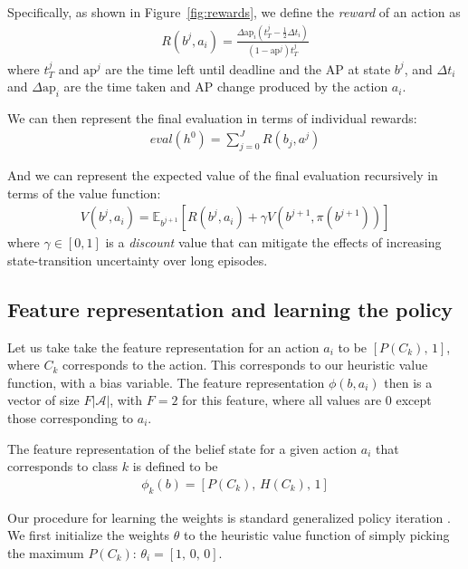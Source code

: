 Specifically, as shown in Figure~\ref{fig:rewards}, we define the \emph{reward} of an action as
\begin{align}\label{eq:advanced}
R(b^j,a_i) = \frac{\Delta \text{ap}_i (t_T^j-\frac{1}{2}\Delta t_i)}{(1-\text{ap}^j)t_T^j}
\end{align}
where $t_T^j$ and $\text{ap}^j$ are the time left until deadline and the AP at state $b^j$, and $\Delta t_i$ and $\Delta \text{ap}_i$ are the time taken and AP change produced by the action $a_i$.


We can then represent the final evaluation in terms of individual rewards:
\begin{align}
eval(h^0) = \sum_{j=0}^J R(b_j,a^{j})
\end{align}

And we can represent the expected value of the final evaluation recursively in terms of the value function:
\begin{align} \label{eq:recursive_value}
V(b^j,a_i) = \mathbb{E}_{b^{j+1}} [R(b^j,a_i) + \gamma V(b^{j+1},\pi(b^{j+1}))]
\end{align}
where $\gamma \in [0,1]$ is a \emph{discount} value that can mitigate the effects of increasing state-transition uncertainty over long episodes.

\subsection{Feature representation and learning the policy}

Let us take take the feature representation for an action $a_i$ to be $[P(C_k), \, 1]$, where $C_k$ corresponds to the action.
This corresponds to our heuristic value function, with a bias variable.
The feature representation $\phi(b,a_i)$ then is a vector of size $F|\mathcal{A}|$, with $F=2$ for this feature, where all values are $0$ except those corresponding to $a_i$.

The feature representation of the belief state for a given action $a_i$ that corresponds to class $k$ is defined to be
\begin{align}
\phi_k(b) = [P(C_k), \, H(C_k), \, 1]
\end{align}

Our procedure for learning the weights is standard generalized policy iteration \cite{Sutton1998}.
We first initialize the weights $\theta$ to the heuristic value function of simply picking the maximum $P(C_k)$: $\theta_i = [1, \,0, \,0]$.

